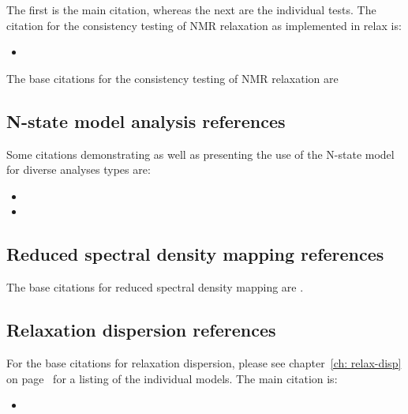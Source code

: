 The first is the main citation, whereas the next are the individual tests.
The citation for the consistency testing of NMR relaxation as implemented in relax is:
\begin{itemize}
  \item {}
\end{itemize}

The base citations for the consistency testing of NMR relaxation are \citet{Fushman99,Farrow95,Fushman98}



\subsection*{N-state model analysis references}

Some citations demonstrating as well as presenting the use of the N-state model for diverse analyses types are:
\begin{itemize}
  \item {}
  \item {}
\end{itemize}



\subsection*{Reduced spectral density mapping references}

The base citations for reduced spectral density mapping are \citet{Farrow95,Lefevre96}.



\subsection*{Relaxation dispersion references}

For the base citations for relaxation dispersion, please see chapter~\ref{ch: relax-disp} on page~\pageref{ch: relax-disp} for a listing of the individual models.
The main citation is:
\begin{itemize}
  \item {}
\end{itemize}




